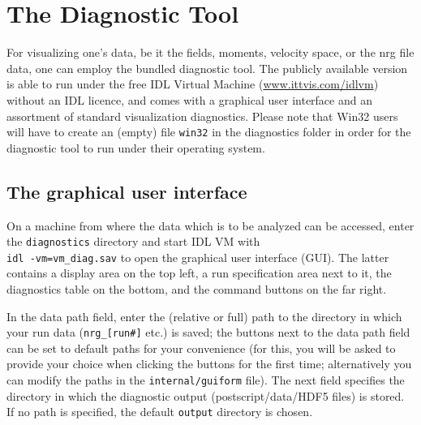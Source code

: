 \documentclass[12pt]{article}
\begin{document}


\newpage

\section{The Diagnostic Tool}
\label{sec:diag}

For visualizing one's \gene data, be it the fields, moments,
velocity space, or the nrg file data, one can employ the bundled
diagnostic tool. The publicly available version is able to run
under the free IDL Virtual Machine (\url{www.ittvis.com/idlvm}) 
without an IDL licence, and comes with a graphical user interface and an
assortment of standard visualization diagnostics. Please note that
Win32 users will have to create an (empty) file \verb|win32| in
the diagnostics folder in order for the \gene diagnostic tool to
run under their operating system.

\subsection{The graphical user interface}

On a machine from where the data which is to be analyzed can be
accessed, enter the \verb|diagnostics| directory and start IDL VM with \\
{\tt idl -vm=vm\_diag.sav} to open the graphical user interface (GUI). 
The latter contains a display area on the top left, a run 
specification area next to it, the diagnostics table on the bottom, 
and the command buttons on the far right.

In the data path field, enter the (relative or full) path
to the directory in which your run data (\verb|nrg_[run#]| etc.) is saved; the buttons next
to the data path field can be set to default paths for your
convenience (for this, you will be asked to provide your choice
when clicking the buttons for the first time; alternatively you 
can modify the paths in the \verb|internal/guiform| file). 
The next field specifies the directory in which the diagnostic output
(postscript/data/HDF5 files)
is stored. If no path is specified, the default \verb|output|
directory is chosen.
\end{document}
